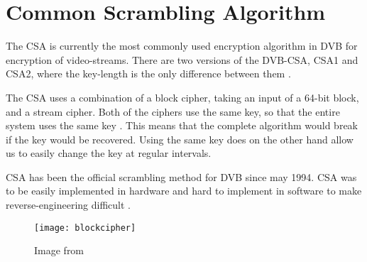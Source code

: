 \chapter{Common Scrambling Algorithm} \label{ch:CSA}
The CSA is currently the most commonly used encryption algorithm in DVB for 
encryption of video-streams. There are two versions of the DVB-CSA, CSA1 and 
CSA2, where the key-length is the only difference between them 
\citep[p. 23]{DVBScene:2013}. 

The CSA uses a combination of a block cipher, taking an input of a 64-bit block, 
and a stream cipher. Both of the ciphers use the same key, so that the entire 
system uses the same key \citep[pp. 271--272]{WeiLi:2007}. This means that the 
complete algorithm would break if the key would be recovered. Using the same key 
does on the other hand allow us to easily change the key at regular intervals. 

CSA has been the official scrambling method for DVB since may 1994. CSA was 
to be easily implemented in hardware and hard to implement in software to make 
reverse-engineering difficult \citep{DVBScene:2013}.




\begin{figure}
  \begin{center}
    \texttt{[image: blockcipher]}
  \end{center}
  \caption{Image from \citet[pp. 49]{Breaking:2012}}
  \label{fig:blockcipher}
\end{figure}

